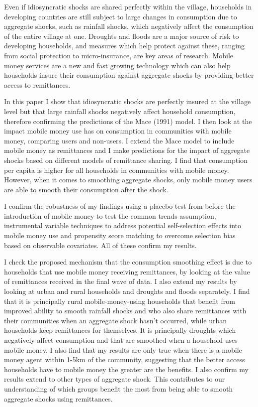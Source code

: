 Even if idiosyncratic shocks are shared perfectly within the village, households in developing countries are still subject to large changes in consumption due to aggregate shocks, such as rainfall shocks, which negatively affect the consumption of the entire village at one. Droughts and floods are a major source of risk to developing households, and measures which help protect against these, ranging from social protection to micro-insurance, are key areas of research. Mobile money services are a new and fast growing technology which can also help households insure their consumption against aggregate shocks by providing better access to remittances.

In this paper I show that idiosyncratic shocks are perfectly insured at the village level but that large rainfall shocks negatively affect household consumption, therefore confirming the predictions of the Mace (1991) model. I then look at the impact mobile money use has on consumption in communities with mobile money, comparing users and non-users. I extend the Mace model to include mobile money as remittances and I make predictions for the impact of aggregate shocks based on different models of remittance sharing. I find that consumption per capita is higher for all households in communities with mobile money. However, when it comes to smoothing aggregate shocks, only mobile money users are  able to smooth their consumption after the shock. 

I confirm the robustness of my findings using a placebo test from before the introduction of mobile money to test the common trends assumption, instrumental variable techniques to address potential self-selection effects into mobile money use and propensity score matching to overcome selection bias based on observable covariates. All of these confirm my results. 

I check the proposed mechanism that the consumption smoothing effect is due to households that use mobile money receiving remittances, by looking at the value of remittances received in the final wave of data. I also extend my results by looking at urban and rural households and droughts and floods separately. I find that it is principally rural mobile-money-using households that benefit from improved ability to smooth rainfall shocks and who also share remittances with their communities when an aggregate shock hasn't occurred, while urban households keep remittances for themselves. It is principally droughts which negatively affect consumption and that are smoothed when a household uses mobile money. I also find that my results are only true when there is a mobile money agent within 1-5km of the community, suggesting that the better access households have to mobile money the greater are the benefits. I also confirm my results extend to other types of aggregate shock. This contributes to our understanding of which groups benefit the most from being able to smooth aggregate shocks using remittances.   




